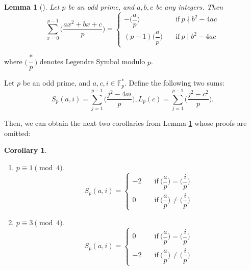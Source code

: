 \documentclass[final,1p,times]{elsarticle}
\newtheorem{sec3_cor1x}{Corollary} [section]
\newtheorem{sec3_lemma1x}{Lemma} [section]
\begin{document}
   \begin{sec3_lemma1x}[\cite{Bib17}]\label{sec3_legendre_symbol}
   Let $ p $ be an odd prime, and $ a,b,c $ be any integers. Then
   \begin{equation*}
   \sum_{x=0}^{p-1}\biggl(\dfrac{ax^{2}+bx+c}{p}\biggr)=
   \begin{cases}
   -\biggl(\dfrac{a}{p}\biggr)\quad &\text{if}\ p\nmid b^{2}-4ac\\
    (p-1)\biggl(\dfrac{a}{p}\biggr)\quad &\text{if}\ p\mid b^{2}-4ac
   \end{cases}
   \end{equation*}
   \end{sec3_lemma1x}
   where $ \biggl(\dfrac{*}{p}\biggr) $ denotes Legendre Symbol modulo $ p $.
   
   Let $ p $ be an odd prime, and $ a,c,i\in \mathbb{F}_{p}^{*} $. Define the following two sums:
   \begin{equation*}
   S_{p}(a,i)=\sum_{j=1}^{p-1}\biggl(\dfrac{j^{2}-4ai}{p}\biggr),
   L_{p}(c)=\sum_{j=1}^{p-1}\biggl(\dfrac{j^{2}-c^{2}}{p}\biggr).
   \end{equation*}
   
   Then, we can obtain the next two corollaries from Lemma \ref{sec3_legendre_symbol} whose proofs are omitted:
   \begin{sec3_cor1x}\label{sec3_Legendre_symbol_spai}
   \begin{enumerate}[(1)]
   \item $ p\equiv 1\pmod 4 $.
    \begin{equation*}
      S_{p}(a,i)=
      \begin{cases}
      -2\quad &\text{if}\ \biggl(\dfrac{a}{p}\biggr)=\biggl(\dfrac{i}{p}\biggr)\\
      0\quad &\text{if}\ \biggl(\dfrac{a}{p}\biggr)\ne\biggl(\dfrac{i}{p}\biggr)
      \end{cases}
   \end{equation*}
   \item $ p\equiv 3\pmod 4 $.
       \begin{equation*}
         S_{p}(a,i)=
         \begin{cases}
         0\quad &\text{if}\ \biggl(\dfrac{a}{p}\biggr)=\biggl(\dfrac{i}{p}\biggr)\\
         -2\quad &\text{if}\ \biggl(\dfrac{a}{p}\biggr)\ne\biggl(\dfrac{i}{p}\biggr)
         \end{cases}
      \end{equation*}
   \end{enumerate}
   \end{sec3_cor1x}
  
\end{document}
